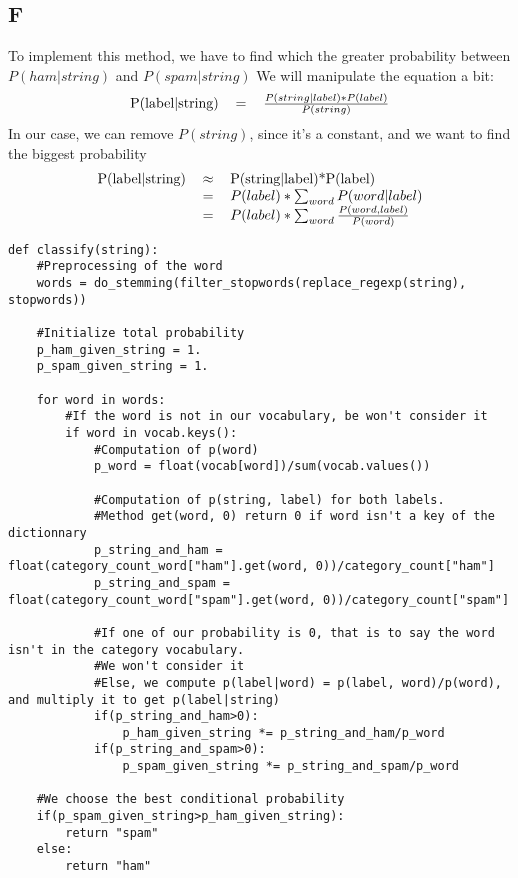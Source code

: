 \documentclass{article}
\begin{document}
        \subsection{F}
            To implement this method, we have to find which the greater probability between $P(ham|string)$ and $P(spam|string)$
            We will manipulate the equation a bit:
            \[
                \begin{tabular}{rcl}
                    P(label|string) & = & $\frac{P(string|label)*P(label)}{P(string)}$
                \end{tabular}
            \]
            In our case, we can remove $P(string)$, since it's a constant, and we want to find the biggest probability
            \[
                \begin{tabular}{rcl}
                    P(label|string) &$\approx$& P(string|label)*P(label)\\
                    & = & $P(label)*\sum_{word}P(word|label)$\\
                    & = & $P(label)*\sum_{word}\frac{P(word, label)}{P(word)}$\\
                \end{tabular}
            \]
            \begin{verbatim}
def classify(string):
    #Preprocessing of the word
    words = do_stemming(filter_stopwords(replace_regexp(string), stopwords))

    #Initialize total probability
    p_ham_given_string = 1.
    p_spam_given_string = 1.

    for word in words:
        #If the word is not in our vocabulary, be won't consider it
        if word in vocab.keys():
            #Computation of p(word)
            p_word = float(vocab[word])/sum(vocab.values())

            #Computation of p(string, label) for both labels.
            #Method get(word, 0) return 0 if word isn't a key of the dictionnary
            p_string_and_ham = float(category_count_word["ham"].get(word, 0))/category_count["ham"]
            p_string_and_spam = float(category_count_word["spam"].get(word, 0))/category_count["spam"]

            #If one of our probability is 0, that is to say the word isn't in the category vocabulary.
            #We won't consider it
            #Else, we compute p(label|word) = p(label, word)/p(word), and multiply it to get p(label|string)
            if(p_string_and_ham>0):
                p_ham_given_string *= p_string_and_ham/p_word
            if(p_string_and_spam>0):
                p_spam_given_string *= p_string_and_spam/p_word

    #We choose the best conditional probability
    if(p_spam_given_string>p_ham_given_string):
        return "spam"
    else:
        return "ham"
            \end{verbatim}
\end{document}
